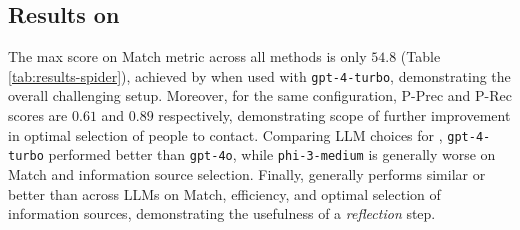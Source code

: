 \subsection{Results on \dataspider{}} 
The max score on Match metric across all methods is only $54.8$ (Table \ref{tab:results-spider}), achieved by \reactagent{} when used with \texttt{gpt-4-turbo}, demonstrating the overall challenging setup. 
Moreover, for the same configuration, P-Prec and P-Rec scores are $0.61$ and $0.89$ respectively, demonstrating scope of further improvement in optimal selection of people to contact.
Comparing LLM choices for \reactagent{}, \texttt{gpt-4-turbo} performed better than \texttt{gpt-4o}, while \texttt{phi-3-medium} is generally worse on Match and information source selection.
Finally, \reactagent{} 
 generally performs similar or better than \noreflectionagent{} across LLMs on Match, efficiency, and optimal selection of information sources, demonstrating the usefulness of a \emph{reflection} step. \\

